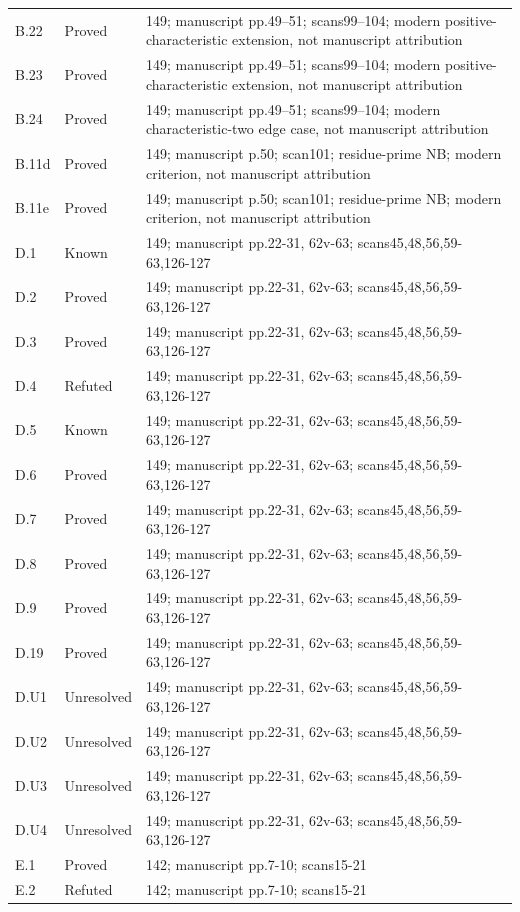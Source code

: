 {\begin{longtable}{p{1.9cm}p{1.7cm}p{10.3cm}}
B.22 & Proved & 149; manuscript pp.49–51; scans99–104; modern positive-characteristic extension, not manuscript attribution \\
B.23 & Proved & 149; manuscript pp.49–51; scans99–104; modern positive-characteristic extension, not manuscript attribution \\
B.24 & Proved & 149; manuscript pp.49–51; scans99–104; modern characteristic-two edge case, not manuscript attribution \\
B.11d & Proved & 149; manuscript p.50; scan101; residue-prime NB; modern criterion, not manuscript attribution \\
B.11e & Proved & 149; manuscript p.50; scan101; residue-prime NB; modern criterion, not manuscript attribution \\
D.1 & Known & 149; manuscript pp.22-31, 62v-63; scans45,48,56,59-63,126-127 \\
D.2 & Proved & 149; manuscript pp.22-31, 62v-63; scans45,48,56,59-63,126-127 \\
D.3 & Proved & 149; manuscript pp.22-31, 62v-63; scans45,48,56,59-63,126-127 \\
D.4 & Refuted & 149; manuscript pp.22-31, 62v-63; scans45,48,56,59-63,126-127 \\
D.5 & Known & 149; manuscript pp.22-31, 62v-63; scans45,48,56,59-63,126-127 \\
D.6 & Proved & 149; manuscript pp.22-31, 62v-63; scans45,48,56,59-63,126-127 \\
D.7 & Proved & 149; manuscript pp.22-31, 62v-63; scans45,48,56,59-63,126-127 \\
D.8 & Proved & 149; manuscript pp.22-31, 62v-63; scans45,48,56,59-63,126-127 \\
D.9 & Proved & 149; manuscript pp.22-31, 62v-63; scans45,48,56,59-63,126-127 \\
D.19 & Proved & 149; manuscript pp.22-31, 62v-63; scans45,48,56,59-63,126-127 \\
D.U1 & Unresolved & 149; manuscript pp.22-31, 62v-63; scans45,48,56,59-63,126-127 \\
D.U2 & Unresolved & 149; manuscript pp.22-31, 62v-63; scans45,48,56,59-63,126-127 \\
D.U3 & Unresolved & 149; manuscript pp.22-31, 62v-63; scans45,48,56,59-63,126-127 \\
D.U4 & Unresolved & 149; manuscript pp.22-31, 62v-63; scans45,48,56,59-63,126-127 \\
E.1 & Proved & 142; manuscript pp.7-10; scans15-21 \\
E.2 & Refuted & 142; manuscript pp.7-10; scans15-21 \\

\end{longtable}}
